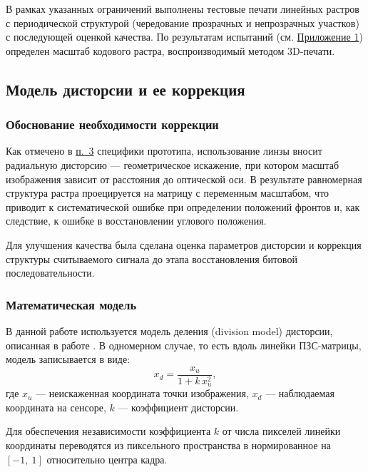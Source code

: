 В рамках указанных ограничений выполнены тестовые печати линейных растров с периодической структурой (чередование прозрачных и непрозрачных участков) с последующей оценкой качества. По результатам испытаний (см. \hyperref[sec:application1]{Приложение 1}) определен масштаб кодового растра, воспроизводимый методом 3D-печати.

\subsection{Модель дисторсии и ее коррекция} \label{subsec:distortion_model}

\subsubsection{Обоснование необходимости коррекции}

Как отмечено в \hyperref[point_lense_distortion]{п.~3} специфики прототипа, использование линзы вносит радиальную дисторсию --- геометрическое искажение, при котором масштаб изображения зависит от расстояния до оптической оси. В результате равномерная структура растра проецируется на матрицу с переменным масштабом, что приводит к систематической ошибке при определении положений фронтов и, как следствие, к ошибке в восстановлении углового положения.

Для улучшения качества была сделана оценка параметров дисторсии и коррекция структуры считываемого сигнала до этапа восстановления битовой последовательности.

\subsubsection{Математическая модель}

В данной работе используется модель деления (division model) дисторсии, описанная в работе \cite{aleman_lens_distortion}. В одномерном случае, то есть вдоль линейки ПЗС-матрицы, модель записывается в виде:
\begin{equation}
x_d = \frac{x_u}{1 + k\,x_u^2},
\label{eq:distortion_forward}
\end{equation}
где $x_u$ --- неискаженная координата точки изображения, $x_d$ --- наблюдаемая координата на сенсоре, $k$ --- коэффициент дисторсии.

Для обеспечения независимости коэффициента $k$ от числа пикселей линейки координаты переводятся из пиксельного пространства в нормированное на $[-1,~1]$ относительно центра кадра.

